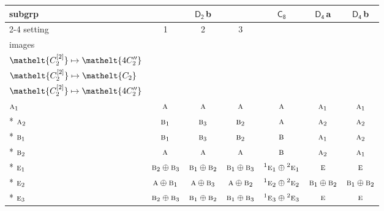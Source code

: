 \documentclass[10pt,a4paper]{article}
\numberwithin{equation}{section}
\newcommand{\eltfont}[1]{{\let\sigma\eltsigma\mathelt{#1}}}
\newcommand{\grp}[1]{\mathsf{#1}}
\newcommand{\irr}[1]{\text{\normalfont\scshape #1}}
\newcommand{\conjpair}[1]{{}^{#1}}
\newcommand{\cls}[1]{\eltfont{#1}}
\newcommand{\clsletter}[1]{\,{\scriptsize\color{black!55}#1}}
\newcommand{\genidx}[2]{#1^{[\mathrm{#2}]}}
\begin{document}
{\small\begin{longtable}{@{}lcccccc@{}}\toprule
subgrp & \multicolumn{3}{c}{\href{D2.pdf}{$\grp{D_{2}}$}\clsletter{b}} & \href{C8.pdf}{$\grp{C_{8}}$} & \href{D4.pdf}{$\grp{D_{4}}$}\clsletter{a} & \href{D4.pdf}{$\grp{D_{4}}$}\clsletter{b}\\\cmidrule(lr){2-4}
setting & 1 & 2 & 3 &  &  & \\
images & {\scriptsize\begin{tabular}[t]{@{}c@{}}$\cls{\genidx{C_{2}}{1}} \mapsto \cls{C_{2}}$\\$\cls{\genidx{C_{2}}{2}} \mapsto \cls{4C_{2}''}$\end{tabular}} & {\scriptsize\begin{tabular}[t]{@{}c@{}}$\cls{\genidx{C_{2}}{1}} \mapsto \cls{4C_{2}''}$\\$\cls{\genidx{C_{2}}{2}} \mapsto \cls{C_{2}}$\end{tabular}} & {\scriptsize\begin{tabular}[t]{@{}c@{}}$\cls{\genidx{C_{2}}{1}} \mapsto \cls{4C_{2}''}$\\$\cls{\genidx{C_{2}}{2}} \mapsto \cls{4C_{2}''}$\end{tabular}} &  &  & \\\midrule\endhead
\bottomrule\endfoot\endlastfoot
$\irr{a}_{1}$ & $\irr{a}$ & $\irr{a}$ & $\irr{a}$ & $\irr{a}$ & $\irr{a}_{1}$ & $\irr{a}_{1}$\\*
$\irr{a}_{2}$ & $\irr{b}_{1}$ & $\irr{b}_{3}$ & $\irr{b}_{2}$ & $\irr{a}$ & $\irr{a}_{2}$ & $\irr{a}_{2}$\\*
$\irr{b}_{1}$ & $\irr{b}_{1}$ & $\irr{b}_{3}$ & $\irr{b}_{2}$ & $\irr{b}$ & $\irr{a}_{1}$ & $\irr{a}_{2}$\\*
$\irr{b}_{2}$ & $\irr{a}$ & $\irr{a}$ & $\irr{a}$ & $\irr{b}$ & $\irr{a}_{2}$ & $\irr{a}_{1}$\\*
$\irr{e}_{1}$ & $\irr{b}_{2}\oplus \irr{b}_{3}$ & $\irr{b}_{1}\oplus \irr{b}_{2}$ & $\irr{b}_{1}\oplus \irr{b}_{3}$ & $\conjpair{1}\irr{e}_{1}\oplus \conjpair{2}\irr{e}_{1}$ & $\irr{e}$ & $\irr{e}$\\*
$\irr{e}_{2}$ & $\irr{a}\oplus \irr{b}_{1}$ & $\irr{a}\oplus \irr{b}_{3}$ & $\irr{a}\oplus \irr{b}_{2}$ & $\conjpair{1}\irr{e}_{2}\oplus \conjpair{2}\irr{e}_{2}$ & $\irr{b}_{1}\oplus \irr{b}_{2}$ & $\irr{b}_{1}\oplus \irr{b}_{2}$\\*
$\irr{e}_{3}$ & $\irr{b}_{2}\oplus \irr{b}_{3}$ & $\irr{b}_{1}\oplus \irr{b}_{2}$ & $\irr{b}_{1}\oplus \irr{b}_{3}$ & $\conjpair{1}\irr{e}_{3}\oplus \conjpair{2}\irr{e}_{3}$ & $\irr{e}$ & $\irr{e}$\\
\bottomrule\end{longtable}}
\end{document}
